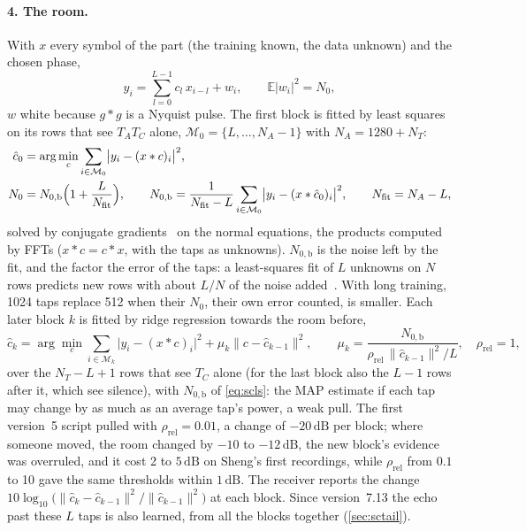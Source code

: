 \documentclass[11pt,a4paper]{article}
\newcommand{\dB}{\,\mathrm{dB}}
\newcommand{\E}{\mathbb{E}}
\theoremstyle{remark}
\begin{document}
\paragraph{4. The room.}
With $x$ every symbol of the part (the training known, the data unknown) and the chosen phase,
\begin{equation}
y_i = \sum_{l=0}^{L-1} c_l\, x_{i-l} + w_i, \qquad \E|w_i|^2 = N_0,
\end{equation}
$w$ white because $g * g$ is a Nyquist pulse. The first block is fitted by least squares on its rows that see $T_A T_C$ alone, $\mathcal M_0 = \{L, \dots, N_A - 1\}$ with $N_A = 1280 + N_T$:
\begin{equation}
\begin{aligned}
\hat c_0 &= \arg\min_c \sum_{i \in \mathcal M_0} \bigl|y_i - (x * c)_i\bigr|^2,\\
N_0 &= N_{0,\mathrm{b}} \Bigl(1 + \frac{L}{N_{\mathrm{fit}}}\Bigr), \qquad N_{0,\mathrm{b}} = \frac{1}{N_{\mathrm{fit}} - L} \sum_{i \in \mathcal M_0} \bigl|y_i - (x * \hat c_0)_i\bigr|^2, \qquad N_{\mathrm{fit}} = N_A - L,
\end{aligned}
\label{eq:scls}
\end{equation}
solved by conjugate gradients~\cite{hestenes} on the normal equations, the products computed by FFTs ($x * c = c * x$, with the taps as unknowns). $N_{0,\mathrm{b}}$ is the noise left by the fit, and the factor the error of the taps: a least-squares fit of $L$ unknowns on $N$ rows predicts new rows with about $L/N$ of the noise added~\cite{kay}. With long training, 1024 taps replace 512 when their $N_0$, their own error counted, is smaller. Each later block $k$ is fitted by ridge regression towards the room before,
\begin{equation}
\hat c_k = \arg\min_c \sum_{i \in \mathcal M_k} \bigl|y_i - (x * c)_i\bigr|^2 + \mu_k \|c - \hat c_{k-1}\|^2, \qquad \mu_k = \frac{N_{0,\mathrm{b}}}{\rho_{\mathrm{rel}}\, \|\hat c_{k-1}\|^2/L}, \quad \rho_{\mathrm{rel}} = 1,
\end{equation}
over the $N_T - L + 1$ rows that see $T_C$ alone (for the last block also the $L - 1$ rows after it, which see silence), with $N_{0,\mathrm{b}}$ of \cref{eq:scls}: the MAP estimate if each tap may change by as much as an average tap's power, a weak pull. The first version~5 script pulled with $\rho_{\mathrm{rel}} = 0.01$, a change of $-20\dB$ per block; where someone moved, the room changed by $-10$ to $-12\dB$, the new block's evidence was overruled, and it cost 2 to $5\dB$ on Sheng's first recordings, while $\rho_{\mathrm{rel}}$ from $0.1$ to 10 gave the same thresholds within $1\dB$. The receiver reports the change $10\log_{10}\bigl(\|\hat c_k - \hat c_{k-1}\|^2/\|\hat c_{k-1}\|^2\bigr)$ at each block. Since version~7.13 the echo past these $L$ taps is also learned, from all the blocks together (\cref{sec:sctail}).
\end{document}
